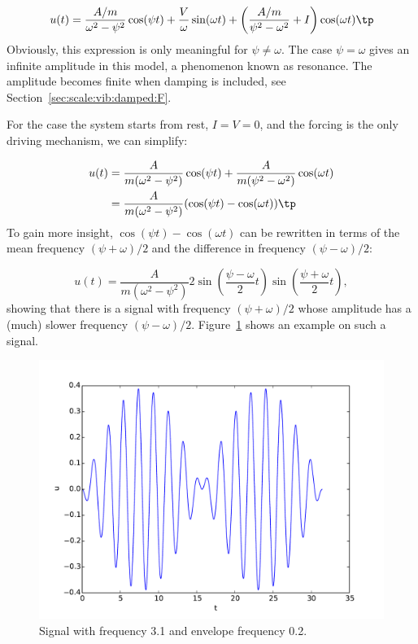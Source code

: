 \documentclass[graybox,envcountchap,sectrefs,final]{svmonodo}
\begin{document}
\[ u(t) = \frac{A/m}{\omega^2 - \psi^2}\cos(\psi t) + \frac{V}{\omega}
   \sin(\omega t) +
\left(\frac{A/m}{\psi^2 - \omega^2} + I\right) \cos (\omega t)\tp
\]
Obviously, this expression is only meaningful for $\psi\neq\omega$. The
case $\psi = \omega$ gives an infinite amplitude in this model, a
phenomenon known as resonance. The amplitude becomes finite when
damping is included,
see Section~\ref{sec:scale:vib:damped:F}.

For the case the system starts from rest, $I=V=0$, and the
forcing is the only driving mechanism, we can simplify:

\begin{align*}
u(t) &= \frac{A}{m(\omega^2 - \psi^2)}\cos(\psi t)
+
\frac{A}{m(\psi^2 - \omega^2)}\cos (\omega t)\\ 
&= \frac{A}{m(\omega^2 - \psi^2)}(\cos(\psi t) - \cos(\omega t))\tp
\end{align*}
To gain more insight, $\cos(\psi t) - \cos(\omega t)$ can be
rewritten in terms of the mean frequency $(\psi + \omega)/2$ and
the difference in frequency $(\psi - \omega)/2$:

\begin{equation}
u(t) = \frac{A}{m(\omega^2 - \psi^2)} 2
\sin\left(\frac{\psi - \omega}{2}t\right)
\sin\left(\frac{\psi + \omega}{2}t\right),
\label{sec:scale:vib:undamped:F:model:sinsin}
\end{equation}
showing that there is a signal with frequency $(\psi + \omega)/2$
whose amplitude has a (much) slower frequency
$(\psi - \omega)/2$. Figure~\ref{sec:scale:vib:fig:envelope} shows
an example on such a signal.



\begin{figure}[!ht]  %
  \centerline{\includegraphics[width=0.8\linewidth]{fig-scaling/envelope.pdf}}
  \caption{
  Signal with frequency 3.1 and envelope frequency 0.2. \label{sec:scale:vib:fig:envelope}
  }
\end{figure}
\end{document}
